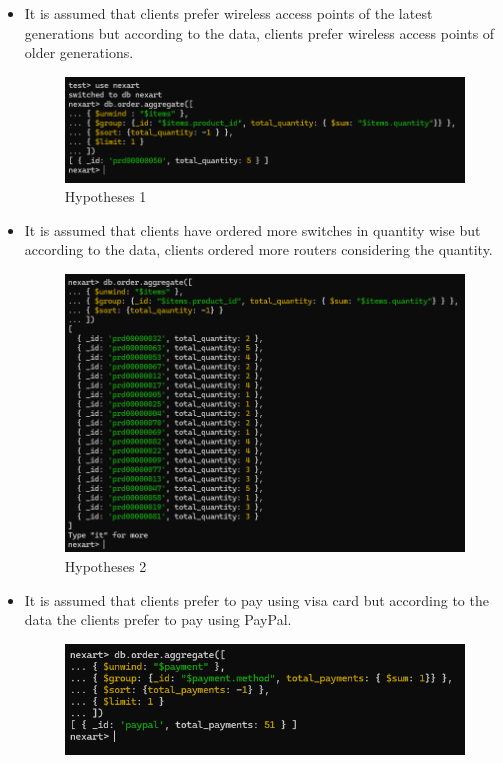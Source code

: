 \documentclass[a4Paper,12pt]{report}
\begin{document}
\begin{itemize}
\item It is assumed that clients prefer wireless access points of the latest generations but according to the data, clients prefer wireless access points of older generations.
\begin{figure}[H]
\centering
\includegraphics[scale=0.5]{images/Q1.1.png}
\caption{Hypotheses 1}
\end{figure}
\item It is assumed that clients have ordered more switches in quantity wise but according to the data, clients ordered more routers considering the quantity.
\begin{figure}[H]
\centering
\includegraphics[scale=0.5]{images/Q1.2.png}
\caption{Hypotheses 2}
\end{figure}
\item It is assumed that clients prefer to pay using visa card but according to the data the clients prefer to pay using PayPal.
\begin{figure}[H]
\centering
\includegraphics[scale=0.5]{images/Q1.3.png}

\end{figure}
\end{itemize}
\end{document}

